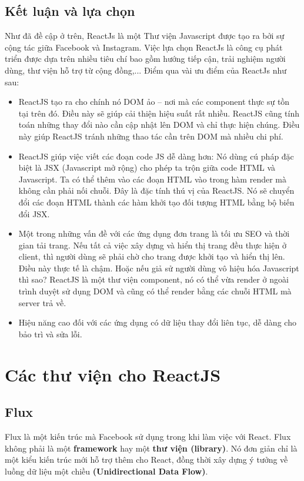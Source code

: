 \subsection{Kết luận và lựa chọn}
Như đã đề cập ở trên, ReactJs là một Thư viện Javascript được tạo ra bởi sự cộng tác giữa Facebook và Instagram. Việc lựa chọn ReactJs là công cụ phát triển được dựa trên nhiều tiêu chí bao gồm hướng tiếp cận, trải nghiệm người dùng, thư viện hỗ trợ từ cộng đồng,... Điểm qua vài ưu điểm của ReactJs như sau:
\begin{itemize}
    \item ReactJS tạo ra cho chính nó DOM ảo – nơi mà các component thực sự tồn tại trên đó. Điều này sẽ giúp cải thiện hiệu suất rất nhiều. ReactJS cũng tính toán những thay đổi nào cần cập nhật lên DOM và chỉ thực hiện chúng. Điều này giúp ReactJS tránh những thao tác cần trên DOM mà nhiều chi phí.
    \item ReactJS giúp việc viết các đoạn code JS dễ dàng hơn: Nó dùng cú pháp đặc biệt là JSX (Javascript mở rộng) cho phép ta trộn giữa code HTML và Javascript. Ta có thể thêm vào các đoạn HTML vào trong hàm render mà không cần phải nối chuỗi. Đây là đặc tính thú vị của ReactJS. Nó sẽ chuyển đổi các đoạn HTML thành các hàm khởi tạo đối tượng HTML bằng bộ biến đổi JSX.
    \item Một trong những vấn đề với các ứng dụng đơn trang là tối ưu SEO và thời gian tải trang. Nếu tất cả việc xây dựng và hiển thị trang đều thực hiện ở client, thì người dùng sẽ phải chờ cho trang được khởi tạo và hiển thị lên. Điều này thực tế là chậm. Hoặc nếu giả sử người dùng vô hiệu hóa Javascript thì sao? ReactJS là một thư viện component, nó có thể vừa render ở ngoài trình duyệt sử dụng DOM và cũng có thể render bằng các chuỗi HTML mà server trả về. 
    \item Hiệu năng cao đối với các ứng dụng có dữ liệu thay đổi liên tục, dễ dàng cho bảo trì và sửa lỗi.
\end{itemize}

\section{Các thư viện cho ReactJS}
\subsection{Flux}
Flux là một kiến trúc mà Facebook sử dụng trong khi làm việc với React. Flux không phải là một \textbf{framework} hay một \textbf{thư viện (library)}. Nó đơn giản chỉ là một kiểu kiến trúc mới hỗ trợ thêm cho React, đồng thời xây dựng ý tưởng về luồng dữ liệu một chiều \textbf{(Unidirectional Data Flow)}.

